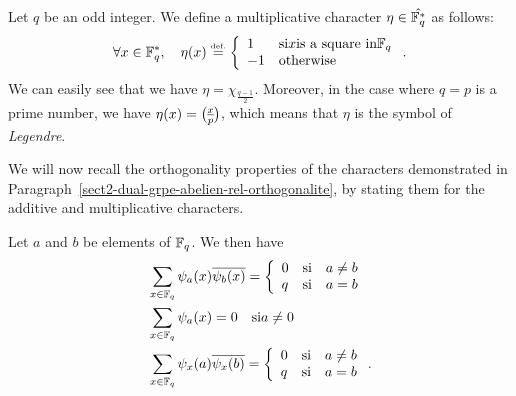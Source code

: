 \begin{exmp}
   \label{notation-28} Let $ q $ be an odd integer. We define a multiplicative character $ \eta \in \hat{\mathbb{F}_q^*} $ as follows:
\begin{equation*}
\forall x \in \mathbb{F}_q^*, \quad \eta (x) \stackrel{\mbox{\upshape\tiny def.}}{=} \left\{\begin{array}{ll} 1 & \text{si} x \text{is a square in} \mathbb{F}_q \\-1 & \text{otherwise} \end{array} \right. .
\end{equation*}
We can easily see that we have $ \eta = \chi_{\frac{q-1}{2}} $. Moreover, in the case where $ q = p $ is a prime number, we have $ \eta (x) = \legsymb{x}{p} $, which means that $ \eta $ is the symbol of \textit{Legendre}.
\end{exmp}
 
 
 
We will now recall the orthogonality properties of the characters demonstrated in Paragraph~\ref{sect2-dual-grpe-abelien-rel-orthogonalite}, by stating them for the additive and multiplicative characters.
 
\begin{prop}
Let $ a $ and $ b $ be elements of $ \mathbb{F}_q $. We then have
\begin{align}
\label{eq-carac-add-orth-line}
& \sum_{x \in \mathbb{F}_q}{\psi_a (x) \overline{\psi_b (x)}} = \left\{\begin{array}{lll} 0 & \text{si} & a \neq b \\q & \text{si} & a = b \end{array} \right. \\
\label{eq-carac-add-sum}
& \sum_{x \in \mathbb{F}_q}{\psi_a (x)} = 0 \quad \text{si} a \neq 0 \\
\label{eq-carac-add-orth-col}
& \sum_{x \in \mathbb{F}_q}{\psi_x (a) \overline{\psi_x (b)}} = \left\{\begin{array}{lll} 0 & \text{si} & a \neq b \\q & \text{si} & a = b \end{array} \right. .
\end{align}
\end{prop}
 
